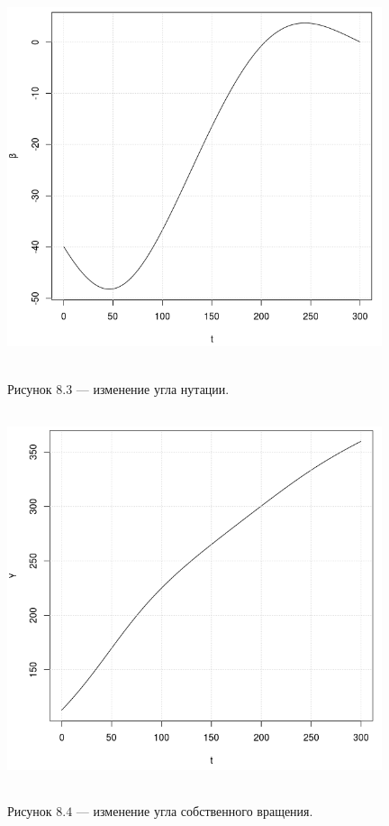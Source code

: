 \documentclass[14pt]{extreport}
\begin{document}
\begin{center}
\includegraphics[width=11cm, height=11cm]{beta.png}

Рисунок $8.3$  --- изменение угла нутации. 
\end{center}

\begin{center}
\includegraphics[width=11cm, height=11cm]{gamma.png}

Рисунок $8.4$  --- изменение угла собственного вращения. 
\end{center}
\end{document}
